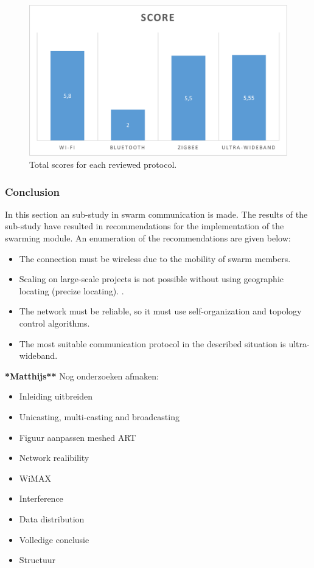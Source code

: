 \documentclass[10pt,a4paper]{article}
\begin{document}
\begin{figure}[H]
   \centering
   \includegraphics[width=1\textwidth]{protocolcomparison}
   \caption{Total scores for each reviewed protocol.}
   \label{fig:protocolcomparison}
\end{figure}



\subsubsection{Conclusion}
In this section an sub-study in swarm communication is made. The results of the sub-study have resulted in recommendations for the implementation of the swarming module. An enumeration of the recommendations are given below:
\begin{itemize}
\setlength\itemsep{0em}
    \item The connection must be wireless due to the mobility of swarm members.
    \item Scaling on large-scale projects is not possible without using geographic locating (precize locating). \cite{geographicalrouting}\cite{scalablelocation}. 
    \item The network must be reliable, so it must use self-organization and topology control algorithms. \cite{WMN1}
    \item The most suitable communication protocol in the described situation is ultra-wideband.
\end{itemize}

\textbf{\Large **Matthijs**}
Nog onderzoeken afmaken:
\begin{itemize}
\setlength\itemsep{0em}
    \item Inleiding uitbreiden
    \item Unicasting, multi-casting and broadcasting
    \item Figuur aanpassen meshed ART
    \item Network realibility
    \item WiMAX
    \item Interference
    \item Data distribution
    \item Volledige conclusie
    \item Structuur
\end{itemize}
\end{document}
